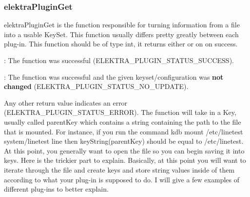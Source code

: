 \subsubsection*{{\ttfamily elektra\+Plugin\+Get}}

{\ttfamily elektra\+Plugin\+Get} is the function responsible for turning information from a file into a usable {\ttfamily Key\+Set}. This function usually differs pretty greatly between each plug-\/in. This function should be of type {\ttfamily int}, it returns either {} or on {} on success.


\begin{DoxyItemize}
\item {}\+: The function was successful ({\ttfamily E\+L\+E\+K\+T\+R\+A\+\_\+\+P\+L\+U\+G\+I\+N\+\_\+\+S\+T\+A\+T\+U\+S\+\_\+\+S\+U\+C\+C\+E\+SS}).
\item {}\+: The function was successful and the given keyset/configuration was {\bfseries not changed} ({\ttfamily E\+L\+E\+K\+T\+R\+A\+\_\+\+P\+L\+U\+G\+I\+N\+\_\+\+S\+T\+A\+T\+U\+S\+\_\+\+N\+O\+\_\+\+U\+P\+D\+A\+TE}).
\end{DoxyItemize}

Any other return value indicates an error ({\ttfamily E\+L\+E\+K\+T\+R\+A\+\_\+\+P\+L\+U\+G\+I\+N\+\_\+\+S\+T\+A\+T\+U\+S\+\_\+\+E\+R\+R\+OR}). The function will take in a {\ttfamily Key}, usually called {\ttfamily parent\+Key} which contains a string containing the path to the file that is mounted. For instance, if you run the command {\ttfamily kdb mount /etc/linetest system/linetest line} then {\ttfamily key\+String(parent\+Key)} should be equal to {\ttfamily /etc/linetest}. At this point, you generally want to open the file so you can begin saving it into keys. Here is the trickier part to explain. Basically, at this point you will want to iterate through the file and create keys and store string values inside of them according to what your plug-\/in is supposed to do. I will give a few examples of different plug-\/ins to better explain.

